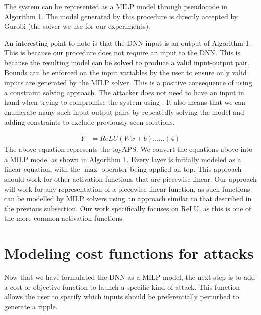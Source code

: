 The system can be represented as a MILP model through pseudocode in Algorithm 1. The model generated by this procedure is directly accepted by Gurobi (the solver we use for our experiments). %

An interesting point to note is that the DNN input is an output of Algorithm 1. This is because our procedure does not require an input to the DNN. This is because the resulting model can be solved to produce a valid input-output pair. Bounds can be enforced on the input variables by the user to ensure only
valid inputs are generated by the MILP solver. This is a positive consequence of using a constraint solving approach. The attacker does not need to have an input in hand when trying to compromise the system using \tool. It also means that we can enumerate many such input-output pairs by repeatedly solving the model
and adding constraints to exclude previously seen solutions.

\begin{align*}
Y &=  ReLU(Wx + b) ...... (4)
\end{align*}
The above equation represents the toyAPS. We convert the equations above into a MILP model as shown in Algorithm 1. Every layer is initially modeled as a linear equation, with the $\max$ operator being applied on top. This approach should work for other activation functions that are piecewise linear. Our approach will work for any representation of a piecewise linear function, as such functions can be modelled by MILP solvers using an approach similar to that described in the previous subsection. Our work specifically focuses on ReLU, as this is one of the more common activation functions.
\section{Modeling cost functions for attacks}
\label{section:costfunction}
Now that we have formulated the DNN as a MILP model, the next step is to add a cost or objective function to launch a specific kind of attack. This function allows the user to specify which inputs should be preferentially perturbed to generate a ripple.

